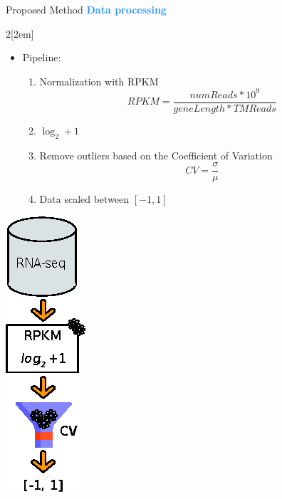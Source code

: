 \begin{frame}{Proposed Method}
\Large\textcolor{dodgerblue}{\textbf{Data processing}}
    \begin{center}
        \normalsize
    \begin{multicols}{2}[\columnsep2em] 
    \vspace{5pt}
    \begin{itemize}
            \item Pipeline:
            \vspace{3pt}
            \begin{enumerate}
                \item Normalization with RPKM
                \begin{equation*}
                    RPKM = \frac{numReads*10^9}{geneLength*TMReads}
                \end{equation*}
                \item $\log_{2}+1$
                \vspace{2pt}
                \item Remove outliers based on the Coefficient of Variation
                \begin{equation*}
                    CV = \frac{\sigma}{\mu}
                \end{equation*}
                \item Data scaled between $[-1, 1]$
            \end{enumerate}
        \end{itemize}
    \columnbreak
    \includegraphics[scale=1.2]{figures/data_processing.eps}
    \end{multicols}
    \end{center}
\end{frame}
